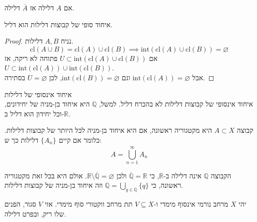 \documentclass{tstextbook}
\begin{document}
\begin{corollary}
אם \(A\) דלילה אז \(\overline{A}\) דלילה.

\end{corollary}
\begin{proposition}
איחוד סופי של קבוצות דלילות הוא דליל.

\end{proposition}
\begin{proof}
נניח \(A,B\) דלילות.\\
$$\text{cl}\left( A\cup B \right)=\text{cl}(A)\cup \text{cl}(B)\implies \text{int}\left( \text{cl}(A)\cup \text{cl}(B) \right)=\varnothing$$
אם \(U\subset \text{int}\left( \text{cl}(A)\cup \text{cl}(B) \right)\) פתוחה לא ריקה, אז \(U\subset \text{int}\left( \text{cl}(A) \right)\cup \text{int}\left( \text{cl}(B) \right)\).\\

אבל \(\text{int}\left( \text{cl}(A) \right)=\varnothing\) וגם \(\text{int}\left( \text{cl}(B) \right)=\varnothing\), לכן \(U=\varnothing\) בסתירה.

\end{proof}
\begin{remark}
איחוד אינסופי של דלילות\\

איחוד אינסופי של קבוצות דלילות לא בהכרח דליל. למשל, \(\mathbb{Q}\) היא איחוד בן-מניה של יחידונים, וכל יחידון הוא דליל ב-\(\mathbb{R}\).

\end{remark}
\begin{definition}
קבוצה \(A\subset X\) היא מקטגוריה ראשונה, אם היא איחוד בן-מניה לכל היותר של קבוצות דלילות. כלומר אם קיים \(\{ A_{n} \}_{}\) דלילות כך ש:
$$A=\bigcup_{n=1}^{\infty}A_{n}$$

\end{definition}
\begin{example}[הרציונאלים]
הקבוצה \(\mathbb{Q}\) אינה דלילה ב-\(\mathbb{R}\), כי \(\overline{\mathbb{Q}}=\mathbb{R}\) ולכן \(\mathbb{R}\setminus\overline{\mathbb{Q}}=\varnothing\). אולם היא בכל זאת מקטגוריה ראשונה, כי \(\mathbb{Q}=\bigcup_{q\in\mathbb{Q}}\{q\}\) וזה איחוד בן-מניה של קבוצות דלילות.

\end{example}
\begin{lemma}
יהי \(X\) מרחב נורמי אינסוף מימדי ו-\(V\subseteq X\) תת מרחב ווקטורי סוף מימדי. אזי \(V\) סגור, הפנים שלו ריק, ובפרט דלילה.

\end{lemma}
\end{document}

